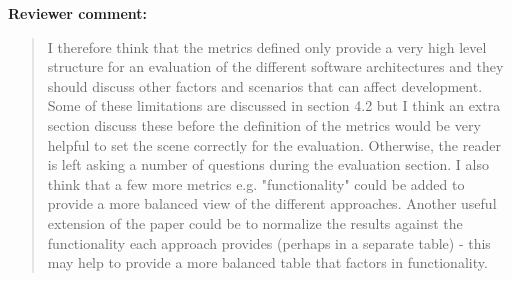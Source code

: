 \documentclass[a4]{letter}
\newenvironment{review}%
{\textbf{Reviewer comment:}\begin{quote}}%
{\end{quote}}%
\begin{document}
\begin{letter}{}
\begin{review}
I therefore think that the metrics defined only provide a very high level structure for an evaluation of the different software architectures and they should discuss other factors and scenarios that can affect development. Some of these limitations are discussed in section 4.2 but I think an extra section discuss these before the definition of the metrics would be very helpful to set the scene correctly for the evaluation. Otherwise, the reader is left asking a number of questions during the evaluation section. I also think that a few more metrics e.g. "functionality" could be added to provide a more balanced view of the different approaches. Another useful extension of the paper could be to normalize the results against the functionality each approach provides (perhaps in a separate table) - this may help to provide a more balanced table that factors in functionality.
\end{review}

\end{letter}
\end{document}
